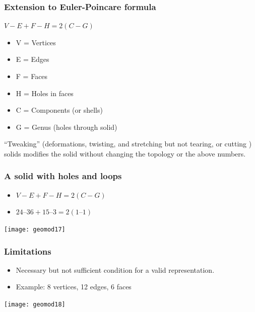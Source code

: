 \begin{frame}[fragile]\frametitle{Extension to Euler-Poincare formula}
$V-E+F-H=2(C-G)$

\begin{itemize}
\item V = Vertices
\item E = Edges
\item F = Faces
\item H = Holes in faces  
\item C = Components (or shells)
\item G = Genus (holes through solid)
\end{itemize}

``Tweaking'' (deformations, twisting, and stretching but not tearing, or cutting ) solids modifies the solid without changing the topology or the above numbers.

\end{frame}

\begin{frame}[fragile]\frametitle{A solid with holes and loops }

\begin{itemize}
\item $V-E+F-H=2(C-G)$
\item $24 – 36 + 15 – 3 = 2( 1 – 1)$
\end{itemize}

			\begin{center}
	\texttt{[image: geomod17]}
			\end{center}
\end{frame}


\begin{frame}[fragile]\frametitle{Limitations}

\begin{itemize}
\item Necessary but not sufficient condition for a valid representation.
\item Example: 8 vertices, 12 edges, 6 faces
\end{itemize}

			\begin{center}
	\texttt{[image: geomod18]}
			\end{center}
\end{frame}

